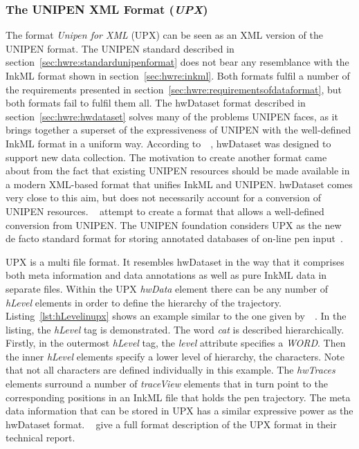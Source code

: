 \subsubsection{The UNIPEN XML Format (\emph{UPX})}
\label{sec:hwre:unipenformatupx}

The format \emph{Unipen for XML} (UPX) can be seen as an XML version of the
UNIPEN format. The UNIPEN standard described in 
section~\ref{sec:hwre:standardunipenformat} does not bear any resemblance
with the InkML format shown in section~\ref{sec:hwre:inkml}.
Both formats fulfil a number of the requirements presented in 
section~\ref{sec:hwre:requirementsofdataformat}, but both formats fail to 
fulfil them all. The hwDataset format described in 
section~\ref{sec:hwre:hwdataset} solves many of the problems UNIPEN faces,
as it brings together a superset of the expressiveness of UNIPEN with
the well-defined InkML format in a uniform way.
According to~~\citeyear{Agrawal2005}, hwDataset
was designed to support new data collection. The motivation to create another
format came about from the fact that existing UNIPEN resources should be made
available in a modern XML-based format that unifies InkML and UNIPEN.
hwDataset comes very close to this aim, but does not necessarily account for a 
conversion of UNIPEN resources. 
~\citeyear{Agrawal2005} attempt to create a format 
that allows a well-defined conversion from UNIPEN.
The UNIPEN foundation considers UPX as the new de facto standard format for 
storing annotated databases of on-line pen 
input~.

UPX is a multi file format. It resembles hwDataset in the way that it comprises 
both meta information and data annotations as well as pure InkML data in 
separate files. Within the UPX \emph{hwData} element there can be any number
of \emph{hLevel} elements in order to define the hierarchy of the trajectory.
Listing~\ref{lst:hLevelinupx} shows an example 
similar to the one given 
by~~\citeyear{UnipenConsortium2006}. 
In the listing, the \emph{hLevel} tag is demonstrated. 
The word \emph{cat} is described hierarchically.
Firstly, in the outermost \emph{hLevel} tag, the \emph{level} attribute specifies
a \emph{WORD}. Then the inner \emph{hLevel} elements specify a lower level
of hierarchy, the characters. Note that not all characters are defined
individually in this example.
The \emph{hwTraces} elements surround a number of \emph{traceView} elements that
in turn point to the corresponding positions in an InkML file that holds the 
pen trajectory. The meta data information that can be stored in UPX has a 
similar expressive power as the hwDataset format.
~\citeyear{Madhvanath2006} give a full format 
description of the UPX format in their technical report.

